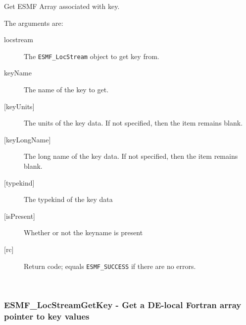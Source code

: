    Get ESMF Array associated with key.
  
   The arguments are:
   \begin{description}
   \item [locstream]
   The {\tt ESMF\_LocStream} object to get key from.
   \item [keyName]
   The name of the key to get. 
   \item [{[keyUnits]}]
   The units of the key data. 
   If not specified, then the item remains blank.  
   \item [{[keyLongName]}]
   The long name of the key data. 
   If not specified, then the item remains blank.  
   \item [{[typekind]}]
   The typekind of the key data
   \item [{[isPresent]}]
   Whether or not the keyname is present 
   \item [{[rc]}]
   Return code; equals {\tt ESMF\_SUCCESS} if there are no errors.
   \end{description} 
 
\mbox{}\hrulefill\ 
 
\subsubsection [ESMF\_LocStreamGetKey] {ESMF\_LocStreamGetKey - Get a DE-local Fortran array pointer to key values}


